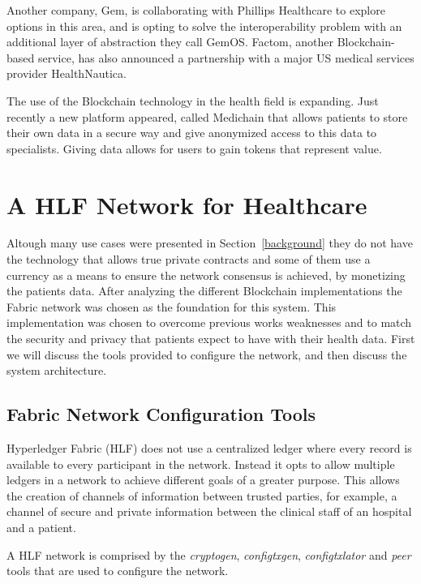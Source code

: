 \documentclass[]{llncs}
\begin{document}
Another company, Gem, is collaborating with Phillips Healthcare to explore options 
in this area, and is opting to solve the interoperability problem with an additional 
layer of abstraction they call GemOS. 
Factom, another Blockchain-based service, has also announced a partnership with a 
major US medical services provider HealthNautica.\cite{BlockchainCompHealth2017,FactomPartnership2017}

The use of the Blockchain technology in the health field is expanding. Just recently a new 
platform appeared, called Medichain that allows patients to store their own data in a secure 
way and give anonymized access to this data to specialists. Giving data allows for users to gain 
tokens that represent value. \cite{MediChain2018}


\section{A HLF Network for Healthcare} \label{HLFHealthcare}
Altough many use cases were presented in Section~\ref{background} they do not have the technology 
that allows true private contracts and some of them use a currency as a means to ensure the network consensus is achieved, by monetizing the patients data.
After analyzing the different Blockchain implementations the Fabric network was 
chosen as the foundation for this system. This implementation was chosen to overcome previous works 
weaknesses and to match the security and privacy that patients expect to have with their health data.
First we will discuss the tools provided to configure the network, and then discuss 
the system architecture.

\subsection{Fabric Network Configuration Tools}

Hyperledger Fabric (HLF) does not use a centralized ledger where every record is available to every 
participant in the network. 
Instead it opts to allow multiple ledgers in a network to achieve different goals of a greater purpose. 
This allows the creation of channels of information between trusted parties, 
for example, a channel of secure and private information between the clinical staff of an hospital and a patient.

A HLF network is comprised by the \textit{cryptogen}, \textit{configtxgen}, 
\textit{configtxlator} and \textit{peer} tools that are used to configure the network.
\end{document}
